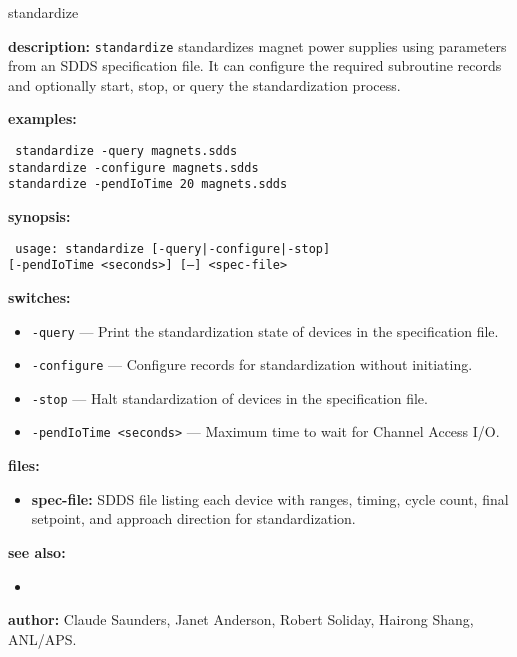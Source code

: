 \begin{sddsprog}{standardize}
\item \textbf{description:}
\verb+standardize+ standardizes magnet power supplies using parameters from an SDDS specification file.
It can configure the required subroutine records and optionally start, stop, or query the standardization process.

\item \textbf{examples:}
  \begin{flushleft}{\tt
    standardize -query magnets.sdds\\
    standardize -configure magnets.sdds\\
    standardize -pendIoTime 20 magnets.sdds
  }\end{flushleft}

\item \textbf{synopsis:}
  \begin{flushleft}{\tt
usage: standardize [-query|-configure|-stop]\\
    \phantom{standardize }[-pendIoTime <seconds>] [--] <spec-file>
  }\end{flushleft}

\item \textbf{switches:}
\begin{itemize}
  \item {\tt -query} --- Print the standardization state of devices in the specification file.
  \item {\tt -configure} --- Configure records for standardization without initiating.
  \item {\tt -stop} --- Halt standardization of devices in the specification file.
  \item {\tt -pendIoTime <seconds>} --- Maximum time to wait for Channel Access I/O.
\end{itemize}

\item \textbf{files:}
\begin{itemize}
  \item \textbf{spec-file:} SDDS file listing each device with ranges, timing, cycle count, final setpoint, and approach direction for standardization.
\end{itemize}

\item \textbf{see also:}
\begin{itemize}
  \item {}
\end{itemize}

\item \textbf{author:} Claude Saunders, Janet Anderson, Robert Soliday, Hairong Shang, ANL/APS.
\end{sddsprog}
